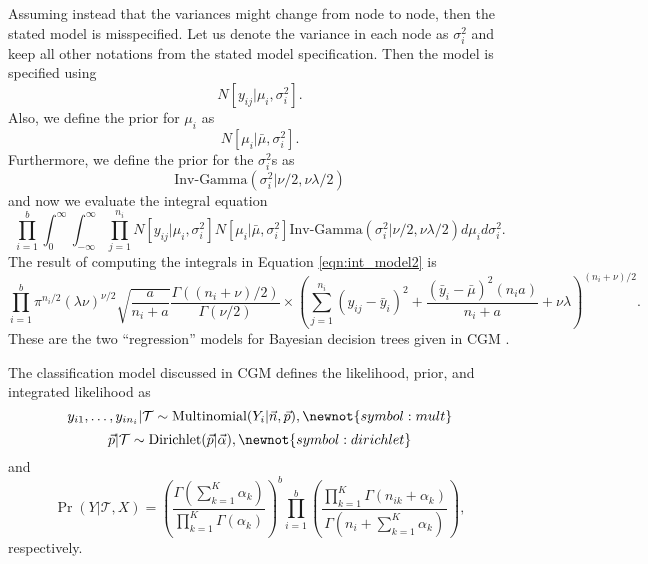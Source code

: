 Assuming instead that the variances might change from node to node, then the stated model is misspecified. Let us denote the variance in each node as $\sigma_i^2$ and keep all other notations from the stated model specification. Then the model is specified using 
\begin{equation}\label{eqn:normal_likelihood_many_variance}
N[y_{ij} \vert \mu_i, \sigma_i^2].
\end{equation}
Also, we define the prior for $\mu_i$ as 
\begin{equation}\label{eqn:multi_variance_prior}
N[\mu_i\vert \bar{\mu}, \sigma_i^2 ].
\end{equation}
Furthermore, we define the prior for the $\sigma_i^2$s as 
\begin{equation}\label{eqn:sigma_priors}
\text{Inv-Gamma}(\sigma_i^2\vert\nu/2, \nu\lambda/2)
\end{equation}
 and now we evaluate the integral equation 
 \begin{equation}\label{eqn:int_model2}
\prod_{i=1}^b \int_0^\infty \int_{-\infty}^{\infty} \prod_{j=1}^{n_i} N[y_{ij} \vert \mu_i, \sigma_i^2]N[\mu_i\vert \bar{\mu}, \sigma_i^2 ]\text{Inv-Gamma}(\sigma_i^2\vert \nu/2, \nu\lambda/2)d\mu_id\sigma_i^2. 
\end{equation}
The result of computing the integrals in Equation \ref{eqn:int_model2} is 
\begin{equation}\label{eqn:int_model3}
\prod_{i=1}^b\pi^{n_i/2}(\lambda\nu)^{\nu/2}\sqrt{\frac{a}{n_i+a}}\frac{\Gamma((n_i+\nu)/2)}{\Gamma(\nu/2)}\times \left( \sum_{j=1}^{n_{i}}(y_{ij}-\bar{y}_i)^2+ \frac{(\bar{y}_i -\bar{\mu})^2(n_ia)}{n_i+a}+\nu\lambda  \right)^{(n_i+\nu)/2}.
\end{equation}
These are the two ``regression'' models  for Bayesian decision trees given in CGM \cite{chipman1998bayesian}. 

The classification model discussed in CGM \cite{chipman1998bayesian} defines the likelihood, prior, and integrated likelihood as
\begin{equation}
y_{i1}, \dots, y_{in_i} \vert \mathcal{T} \sim \text{Multinomial}(Y_i \vert \vec{n}, \vec{p}),\newnot{symbol:mult}
\end{equation} 
\begin{equation}
\vec{p} \vert \mathcal{T} \sim \text{Dirichlet}(\vec{p}\vert \vec{\alpha}), \newnot{symbol:dirichlet}
\end{equation} 
and
\begin{equation}\label{eqn:int_model4}
\Pr(Y\vert \mathcal{T}, X)=\left(\frac{\Gamma(\sum_{k=1}^K\alpha_k)}{\prod_{k=1}^K\Gamma(\alpha_k)} \right)^b \prod_{i=1}^b\left( \frac{\prod_{k=1}^K\Gamma(n_{ik}+\alpha_k)}{\Gamma(n_i +\sum_{k=1}^K\alpha_k)} \right),
\end{equation} 
respectively. 
 
